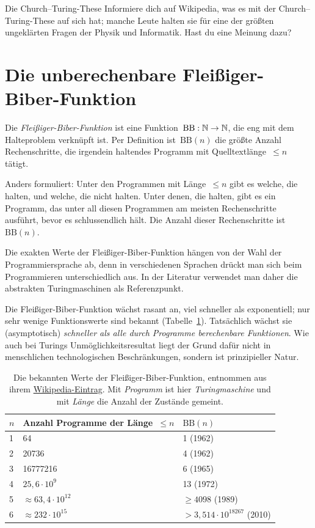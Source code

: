 \documentclass[twoside]{../zirkelblatt1415}
\theoremstyle{definition}
\theoremstyle{plain}
\theoremstyle{remark}
\newcommand{\BB}{\mathrm{BB}}
\begin{document}
\begin{aufgabe}{Die Church--Turing-These}
Informiere dich auf Wikipedia, was es mit der Church--Turing-These auf sich
hat; manche Leute halten sie für eine der größten ungeklärten Fragen der Physik
und Informatik. Hast du eine Meinung dazu?
\end{aufgabe}


\section{Die unberechenbare Fleißiger-Biber-Funktion}

Die \emph{Fleißiger-Biber-Funktion} ist eine Funktion~$\BB : \NN \to \NN$, die
eng mit dem Halteproblem verknüpft ist. Per Definition ist~$\BB(n)$ die größte
Anzahl Rechenschritte, die irgendein haltendes Programm mit
Quelltextlänge~$\leq n$ tätigt.

Anders formuliert: Unter den Programmen mit Länge~$\leq n$ gibt es welche, die
halten, und welche, die nicht halten. Unter denen, die halten, gibt es ein
Programm, das unter all diesen Programmen am meisten Rechenschritte ausführt,
bevor es schlussendlich hält. Die Anzahl dieser Rechenschritte ist~$\BB(n)$.

Die exakten Werte der Fleißiger-Biber-Funktion hängen von der Wahl der
Programmiersprache ab, denn in verschiedenen Sprachen drückt man sich beim
Programmieren unterschiedlich aus. In der Literatur verwendet man daher die
abstrakten Turingmaschinen als Referenzpunkt.

Die Fleißiger-Biber-Funktion wächst rasant an, viel schneller als exponentiell;
nur sehr wenige Funktionswerte sind bekannt (Tabelle~\ref{tab:bb}). Tatsächlich
wächst sie (asymptotisch) \emph{schneller als alle durch Programme berechenbare
Funktionen}. Wie auch bei Turings Unmöglichkeitsresultat liegt der Grund dafür
nicht in menschlichen technologischen Beschränkungen, sondern ist
prinzipieller Natur.

\begin{table}[b]
  \begin{tabular}{@{}lll@{}}
    $n$ & Anzahl Programme der Länge~$\leq n$ & $\BB(n)$ \\\midrule
    1 & 64 & 1 (1962) \\
    2 & 20736 & 4 (1962) \\
    3 & 16777216 & 6 (1965) \\
    4 & $25{,}6 \cdot 10^9$ & 13 (1972) \\
    5 & $\approx 63{,}4 \cdot 10^{12}$ & $\geq 4098$ (1989) \\
    6 & $\approx 232 \cdot 10^{15}$ & $> 3{,}514 \cdot 10^{18267}$ (2010) \\
  \end{tabular}
  \centering
  \caption{\label{tab:bb}Die bekannten Werte der Fleißiger-Biber-Funktion,
  entnommen aus ihrem
  \href{http://de.wikipedia.org/wiki/Fleißiger_Biber}{Wikipedia-Eintrag}. Mit
  \emph{Programm} ist hier \emph{Turingmaschine} und mit \emph{Länge}
  die Anzahl der Zustände gemeint.}
\end{table}
\end{document}
